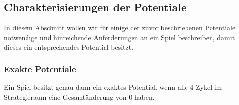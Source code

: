\subsection{Charakterisierungen der Potentiale}\label{sec:Potentiale:Charakterisierungen}

In diesem Abschnitt wollen wir für einige der zuvor beschriebenen Potentiale notwendige und hinreichende Anforderungen an ein Spiel beschreiben, damit dieses ein entsprechendes Potential besitzt.

\subsubsection{Exakte Potentiale}

\begin{satz}\label{satz:CharExPot}
	Ein Spiel besitzt genau dann ein exaktes Potential, wenn alle 4-Zykel im Strategieraum eine Gesamtänderung von $0$ haben.
\end{satz}

